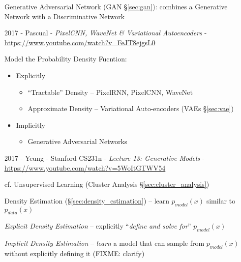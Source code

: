 \fist Generative Adversarial Network (GAN \S\ref{sec:gan}): combines a
Generative Network with a Discriminative Network

2017 - Pascual - \emph{PixelCNN, WaveNet \& Variational Autoencoders} -
\url{https://www.youtube.com/watch?v=FeJT8ejgsL0}

Model the Probability Density Fucntion:
\begin{itemize}
  \item Explicitly
    \begin{itemize}
      \item ``Tractable'' Density -- PixelRNN, PixelCNN, WaveNet
      \item Approximate Density -- Variational Auto-encoders (VAEs
        \S\ref{sec:vae})
    \end{itemize}
  \item Implicitly
    \begin{itemize}
      \item Generative Adversarial Networks
    \end{itemize}
\end{itemize}

2017 - Yeung - Stanford CS231n - \emph{Lecture 13: Generative Models} -
\url{https://www.youtube.com/watch?v=5WoItGTWV54}

cf. Unsupervised Learning (Cluster Analysis \S\ref{sec:cluster_analysis})

Density Estimation (\S\ref{sec:density_estimation}) -- learn $p_{model}(x)$
similar to $p_{data}(x)$

\emph{Explicit Density Estimation} -- explicitly ``\emph{define and solve for}''
$p_{model}(x)$

\emph{Implicit Density Estimation} -- \emph{learn} a model that can sample from
$p_{model}(x)$ without explicitly defining it (FIXME: clarify)

